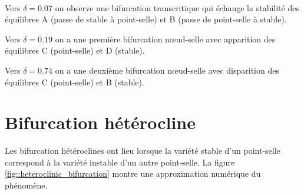 \documentclass[12pt]{article}
\begin{document}
\paragraph{}
Vers $\delta = 0.07$ on observe une bifurcation transcritique qui échange la stabilité des équilibres A (passe de stable à point-selle) et B (passe de point-selle à stable). 

Vers $\delta = 0.19$ on a une première bifurcation n\oe ud-selle avec apparition des équilibres C (point-selle) et D (stable).

Vers $\delta = 0.74$ on a une deuxième bifurcation n\oe ud-selle avec disparition des équilibres C (point-selle) et B (stable).


\section{Bifurcation hétérocline}
Les bifurcation hétéroclines ont lieu lorsque la variété stable d'un point-selle correspond à la variété instable d'un autre point-selle. La figure \ref{fig::heteroclinic_bifurcation} montre une approximation numérique du phénomène.
\end{document}
